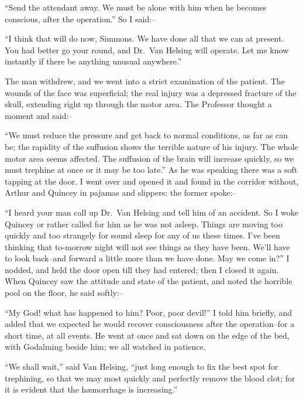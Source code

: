 \documentclass[12pt,openright]{book}
\begin{document}
“Send the attendant away. We must be alone with him when he becomes conscious, after the operation.” So I said:–

“I think that will do now, Simmons. We have done all that we can at present. You had better go your round, and Dr. Van Helsing will operate. Let me know instantly if there be anything unusual anywhere.”

The man withdrew, and we went into a strict examination of the patient. The wounds of the face was superficial; the real injury was a depressed fracture of the skull, extending right up through the motor area. The Professor thought a moment and said:–

“We must reduce the pressure and get back to normal conditions, as far as can be; the rapidity of the suffusion shows the terrible nature of his injury. The whole motor area seems affected. The suffusion of the brain will increase quickly, so we must trephine at once or it may be too late.” As he was speaking there was a soft tapping at the door. I went over and opened it and found in the corridor without, Arthur and Quincey in pajamas and slippers: the former spoke:–

“I heard your man call up Dr. Van Helsing and tell him of an accident. So I woke Quincey or rather called for him as he was not asleep. Things are moving too quickly and too strangely for sound sleep for any of us these times. I’ve been thinking that to-morrow night will not see things as they have been. We’ll have to look back–and forward a little more than we have done. May we come in?” I nodded, and held the door open till they had entered; then I closed it again. When Quincey saw the attitude and state of the patient, and noted the horrible pool on the floor, he said softly:–

“My God! what has happened to him? Poor, poor devil!” I told him briefly, and added that we expected he would recover consciousness after the operation–for a short time, at all events. He went at once and sat down on the edge of the bed, with Godalming beside him; we all watched in patience.

“We shall wait,” said Van Helsing, “just long enough to fix the best spot for trephining, so that we may most quickly and perfectly remove the blood clot; for it is evident that the hæmorrhage is increasing.”
\end{document}

